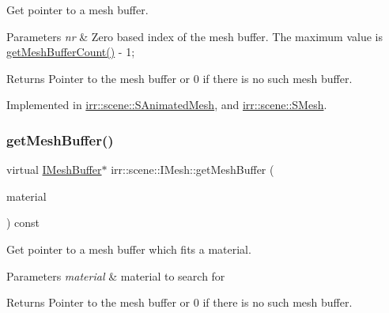 Get pointer to a mesh buffer. 


\begin{DoxyParams}{Parameters}
{\em nr} & Zero based index of the mesh buffer. The maximum value is \hyperlink{classirr_1_1scene_1_1IMesh_a2ebed0bdae2d6537c36b0b7ac831edb8}{get\+Mesh\+Buffer\+Count()} -\/ 1; \\
\hline
\end{DoxyParams}
\begin{DoxyReturn}{Returns}
Pointer to the mesh buffer or 0 if there is no such mesh buffer. 
\end{DoxyReturn}


Implemented in \hyperlink{structirr_1_1scene_1_1SAnimatedMesh_ac186898d77ded042569a27609195d263}{irr\+::scene\+::\+S\+Animated\+Mesh}, and \hyperlink{structirr_1_1scene_1_1SMesh_ad88b3ecd7e6f00e0ea5defb76ed205fc}{irr\+::scene\+::\+S\+Mesh}.

\mbox{\label{classirr_1_1scene_1_1IMesh_a9573dace82efb01ba1f35f9cc28a4ced}} 
\subsubsection{\texorpdfstring{get\+Mesh\+Buffer()}{getMeshBuffer()}\hspace{0.1cm}{\footnotesize\ttfamily [2/2]}}
{\footnotesize\ttfamily virtual \hyperlink{classirr_1_1scene_1_1IMeshBuffer}{I\+Mesh\+Buffer}$\ast$ irr\+::scene\+::\+I\+Mesh\+::get\+Mesh\+Buffer (\begin{DoxyParamCaption}\item[{const \hyperlink{classirr_1_1video_1_1SMaterial}{video\+::\+S\+Material} \&}]{material }\end{DoxyParamCaption}) const\hspace{0.3cm}{\ttfamily [pure virtual]}}



Get pointer to a mesh buffer which fits a material. 


\begin{DoxyParams}{Parameters}
{\em material} & material to search for \\
\hline
\end{DoxyParams}
\begin{DoxyReturn}{Returns}
Pointer to the mesh buffer or 0 if there is no such mesh buffer. 
\end{DoxyReturn}


